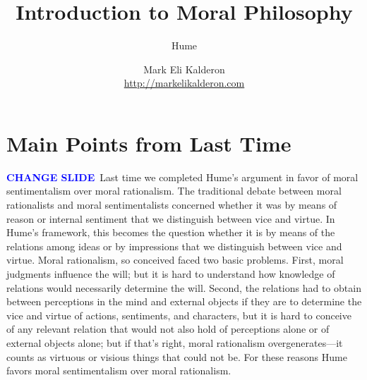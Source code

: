 %
%
%

\newcommand{\change}{\textcolor{blue}{\textbf{CHANGE SLIDE}}}
\def\myauthor{Mark Eli Kalderon} 
\def\mytitle{Introduction to Moral Philosophy}
\def\mysubtitle{Hume}
\def\myinstitution{University College London}
\def\myurl{http://markelikalderon.com}



\usepackage{pgf}
\usepackage{tikz}
\usepackage{hyperref}


\title{\mytitle}
\subtitle{\mysubtitle}

\author{\myauthor\\
\url{\myurl}}
\institute{\myinstitution}





\frame{\maketitle}

\section{Main Points from Last Time}\label{sec:main_points_from_last_time} %

\change\ Last time we completed Hume's argument in favor of moral sentimentalism over moral rationalism. The traditional debate between moral rationalists and moral sentimentalists concerned whether it was by means of reason or internal sentiment that we distinguish between vice and virtue. In Hume's framework, this becomes the question whether it is by means of the relations among ideas or by impressions that we distinguish between vice and virtue. Moral rationalism, so conceived faced two basic problems. First, moral judgments influence the will; but it is hard to understand how knowledge of relations would necessarily determine the will. Second, the relations had to obtain between perceptions in the mind and external objects if they are to determine the vice and virtue of actions, sentiments, and characters, but it is hard to conceive of any relevant relation that would not also hold of perceptions alone or of external objects alone; but if that's right, moral rationalism overgenerates---it counts as virtuous or visious things that could not be. For these reasons Hume favors moral sentimentalism over moral rationalism. 

